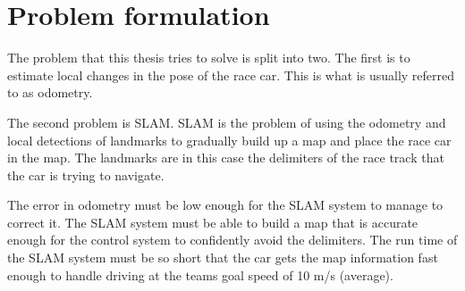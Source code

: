 \section{Problem formulation}

The problem that this thesis tries to solve is split into two. The first is to estimate local changes in the pose of the race car. This is what is usually referred to as odometry. 

The second problem is \gls{SLAM}. \gls{SLAM} is the problem of using the odometry and local detections of landmarks to gradually build up a map and place the race car in the map. The landmarks are in this case the delimiters of the race track that the car is trying to navigate.

The error in odometry must be low enough for the SLAM system to manage to correct it. The SLAM system must be able to build a map that is accurate enough for the control system to confidently avoid the delimiters. The run time of the SLAM system must be so short that the car gets the map information fast enough to handle driving at the teams goal speed of 10 \si{\metre / \second} (average).